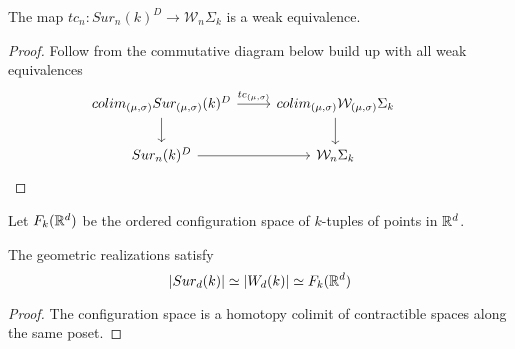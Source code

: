\begin{corollary}
	The map $tc_{n}:Sur_{n}(k)^{D}\rightarrow \mathcal{W}_{n}\Sigma_{k}$ is a weak equivalence.
\end{corollary}

\begin{proof}
	Follow from the commutative diagram below build up with all weak equivalences
	\begin{equation*}
		\begin{tikzcd}
			colim_{(\mu,\sigma)}Sur_{(\mu,\sigma)}(k)^{D} \arrow[r,"tc_{(\mu,\sigma)}"] \arrow[d]& colim_{(\mu,\sigma)}\mathcal{W}_{(\mu,\sigma)}\Sigma_{k} \arrow[d] \\
			Sur_{n}(k)^{D}\arrow[r] & \mathcal{W}_{n}\Sigma_{k}& 
		\end{tikzcd}
	\end{equation*}
\end{proof}

Let  $F_k(\mathbb{R}^{d})$ be the ordered configuration space of $k$-tuples of points in  $\mathbb{R}^{d}$. 

\begin{proposition}
The geometric realizations satisfy 
$$|Sur_d(k)| \simeq |W_d(k)|  \simeq F_k(\mathbb{R}^{d})$$
\end{proposition}

\begin{proof}
The configuration space is a homotopy colimit of contractible spaces along the same poset.
\end{proof}